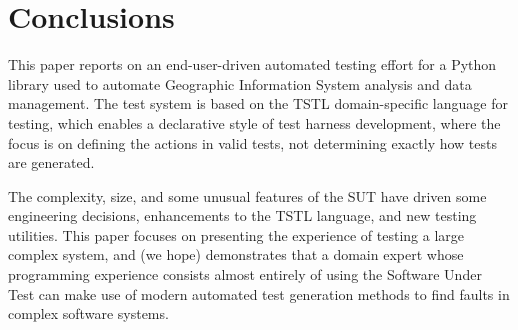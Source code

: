 \section{Conclusions}
\label{conclusion}

This paper reports on an end-user-driven automated testing effort for a Python
library used to automate Geographic Information System analysis and
data management.  The test system is based on the TSTL
\cite{NFM15,ISSTA15,tstl} domain-specific language for testing, which
enables a declarative style of test harness development, where the
focus is on defining the actions in valid tests, not determining
exactly how tests are generated.

The complexity, size, and some unusual features of
the SUT have driven some engineering decisions, enhancements to the
TSTL language, and new testing utilities.  This paper focuses on
presenting the experience of testing a large complex system, and (we
hope) demonstrates that a domain expert whose programming experience
consists almost entirely of using the Software Under Test can make use
of modern automated test generation methods to find faults in complex software systems.